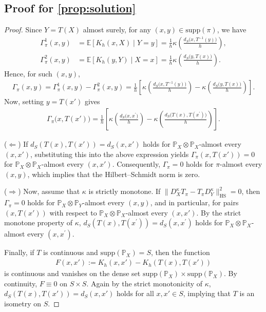 \documentclass{article}
\begin{document}
\subsection{Proof for \cref{prop:solution}}\label{pf:prop:solution}
\begin{proof}
	Since $Y = T(X)$ almost surely, for any $(x,y) \in \mathrm{supp}(\pi)$, we have
	\begin{align*}
		\Gamma_\pi^1(x,y) &= \mathbb{E}[K_h(x,X)\mid Y=y] = \frac{1}{h}\kappa\left(\frac{d_S\bigl(x,T^{-1}(y)\bigr)}{h}\right), \\
		\Gamma_\pi^2(x,y) &= \mathbb{E}[K_h(y,Y)\mid X=x] = \frac{1}{h}\kappa\left(\frac{d_S\bigl(y,T(x)\bigr)}{h}\right).
	\end{align*}
	Hence, for such $(x,y)$,
	\begin{align*}
		\Gamma_\pi(x,y)
		= \Gamma_\pi^1(x,y) - \Gamma_\pi^2(x,y)
		= \frac{1}{h}\left[\kappa\left(\frac{d_S\bigl(x,T^{-1}(y)\bigr)}{h}\right) - \kappa\left(\frac{d_S\bigl(y,T(x)\bigr)}{h}\right)\right] .
	\end{align*}
	Now, setting $y = T(x')$ gives
	\begin{align*}
		\Gamma_\pi\bigl(x,T(x')\bigr)
		= \frac{1}{h}\left[\kappa\left(\frac{d_S\bigl(x,x^\prime\bigr)}{h}\right) - \kappa\left(\frac{d_S\bigl(T(x),T(x^\prime)\bigr)}{h}\right)\right] .
	\end{align*}
	
	($\Leftarrow$) If $d_S(T(x),T(x')) = d_S(x,x')$ holds for $\mathbb{P}_X \otimes \mathbb{P}_X$-almost every $(x,x')$, substituting this into the above expression yields $\Gamma_\pi(x,T(x')) = 0$ for $\mathbb{P}_X \otimes \mathbb{P}_X$-almost every $(x,x')$. Consequently, $\Gamma_\pi = 0$ holds for $\pi$-almost every $(x,y)$, which implies that the Hilbert–Schmidt norm is zero.
	
	($\Rightarrow$) Now, assume that $\kappa$ is strictly monotone. If $\|D_X^{\kappa}T_\pi - T_\pi D_Y^{\kappa}\|_{\mathrm{HS}}^2 = 0$, then $\Gamma_\pi = 0$ holds for $\mathbb{P}_X \otimes \mathbb{P}_Y$-almost every $(x,y)$, and in particular, for pairs $(x,T(x'))$ with respect to $\mathbb{P}_X \otimes \mathbb{P}_X$-almost every $(x,x')$. By the strict monotone property of $\kappa$, $d_S(T(x),T(x^\prime)) = d_S(x,x^\prime)$ holds for $\mathbb{P}_X \otimes \mathbb{P}_X$-almost every $(x,x^\prime)$.
	
	Finally, if $T$ is continuous and $\mathrm{supp}(\mathbb{P}_X) = S$, then the function
	\begin{align*}
		F(x,x') := K_h(x,x') - K_h(T(x),T(x'))
	\end{align*}
	is continuous and vanishes on the dense set $\mathrm{supp}(\mathbb{P}_X) \times \mathrm{supp}(\mathbb{P}_X)$.  
	By continuity, $F \equiv 0$ on $S \times S$.
	Again by the strict monotonicity of $\kappa$, $d_S(T(x),T(x')) = d_S(x,x')$ holds for all $x,x' \in S$, implying that $T$ is an isometry on $S$.
\end{proof}
\end{document}
